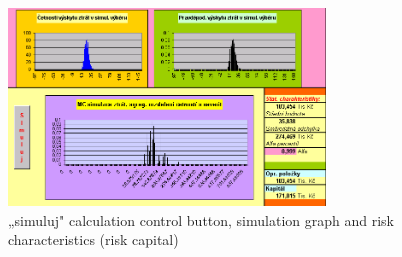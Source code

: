 \documentclass{article}
\begin{document}
\begin{figure}[H]
  \caption{„simuluj" calculation control button, simulation graph and risk characteristics (risk capital)}
  \centering
    \includegraphics[width=0.75\textwidth]{simuluj}
\end{figure}



\end{document}
